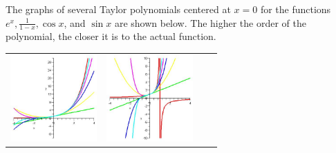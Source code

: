 The graphs of several Taylor polynomials centered at $x=0$ for the functions $e^x, \frac{1}{1-x},\cos x$, and $\sin x$ are shown below. The higher the order of the polynomial, the closer it is to the actual function.
\newcommand{\mywidth}{1.3in}
\begin{center}
\begin{tabular}{cccc}
\includegraphics[width=\mywidth]{08-Power-Series/PowerSeries/taylore}&
\includegraphics[width=\mywidth]{08-Power-Series/PowerSeries/taylor1}&

\end{tabular}
\end{center}
